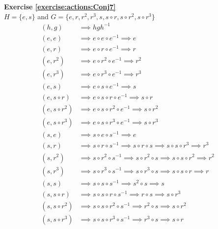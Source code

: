 \noindent\textbf{Exercise \ref{exercise:actions:Conj7}}
\\
$H = \{e, s\}$ and $G = \{e, r, r^2, r^3, s, s \circ r, s \circ r^2, s \circ r^3\}$
\begin{align*}
(h, g) &\implies hgh^{-1}
\\
(e, e) &\implies e \circ e \circ e^{-1} \implies e
\\
(e, r) &\implies e \circ r \circ e^{-1} \implies r
\\
(e, r^2) &\implies e \circ r^2 \circ e^{-1} \implies r^2
\\
(e, r^3) &\implies e \circ r^3 \circ e^{-1} \implies r^3
\\
(e, s) &\implies e \circ s \circ e^{-1} \implies s
\\
(e, s \circ r) &\implies e \circ s \circ r \circ e^{-1} \implies s \circ r
\\
(e, s \circ r^2) &\implies e \circ s \circ r^2 \circ e^{-1} \implies s \circ r^2
\\
(e, s \circ r^3) &\implies e \circ s \circ r^3 \circ e^{-1} \implies s \circ r^3
\\
(s, e) &\implies s \circ e \circ s^{-1} \implies e
\\
(s, r) &\implies s \circ r \circ s^{-1} \implies s \circ r \circ s \implies s \circ s \circ r^3 \implies r^3
\\
(s, r^2) &\implies s \circ r^2 \circ s^{-1} \implies s \circ r^2 \circ s \implies s \circ s \circ r^2 \implies r^2
\\
(s, r^3) &\implies s \circ r^3 \circ s^{-1} \implies s \circ r^3 \circ s \implies s \circ s \circ r \implies r
\\
(s, s) &\implies s \circ s \circ s^{-1} \implies s^2 \circ s \implies s
\\
(s, s \circ r) &\implies s \circ s \circ r \circ s^{-1} \implies r \circ s \implies s \circ r^3
\\
(s, s \circ r^2) &\implies s \circ s \circ r^2 \circ s^{-1} \implies r^2 \circ s \implies s \circ r^2
\\
(s, s \circ r^3) &\implies s \circ s \circ r^3 \circ s^{-1} \implies r^3 \circ s \implies s \circ r
\end{align*}

